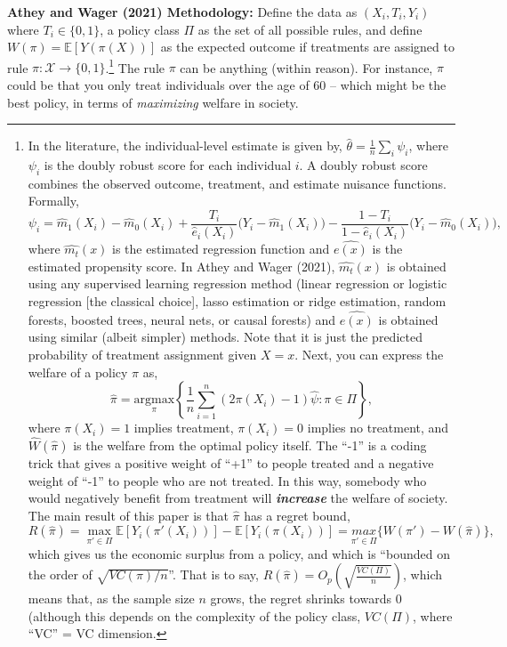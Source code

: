 \documentclass[12pt,letterpaper,doublespace, oneside]{article}
\begin{document}
\noindent\textbf{Athey and Wager (2021) Methodology:} 
Define the data as $(X_i,T_i,Y_i)$ where $T_i \in \{0,1\}$, a policy class $\Pi$ as the set of all possible rules, and define $W(\pi) = \mathbb{E}[Y(\pi(X))]$ as the expected outcome if treatments are assigned to rule $\pi: \mathcal{X} \to \{0,1\}$.\footnote{In the literature, the individual-level estimate is given by, $\hat{\theta} = \frac{1}{n}\sum_i\psi_i$, where $\psi_i$ is the doubly robust score for each individual $i$. A doubly robust score combines the observed outcome, treatment, and estimate nuisance functions. Formally, 
\[
\psi_i = \hat{m}_1(X_i) - \hat{m}_0(X_i) + \frac{T_i}{\hat{e}_i(X_i)}\big(Y_i - \hat{m}_1(X_i)\big) - \frac{1-T_i}{1 - \hat{e}_i(X_i)}\big(Y_i - \hat{m}_0(X_i)\big),
\]
where $\hat{m_t}(x)$ is the estimated regression function and $\hat{e(x)}$ is the estimated propensity score. In Athey and Wager (2021), $\hat{m_t}(x)$ is obtained using any supervised learning regression method (linear regression or logistic regression [the classical choice], lasso estimation or ridge estimation, random forests, boosted trees, neural nets, or causal forests) and $\hat{e(x)}$ is obtained using similar (albeit simpler) methods. Note that it is just the predicted probability of treatment assignment given $X = x$. Next, you can express the welfare of a policy $\pi$ as,
\[
\hat{\pi} = \underset{\pi}{\text{argmax}}\left\{\frac{1}{n}\sum_{i=1}^n(2\pi(X_i) - 1)\hat{\psi}: \pi \in \Pi\right\},
\]
where $\pi(X_i) = 1$ implies treatment, $\pi(X_i) = 0$ implies no treatment, and $\hat{W}(\hat{\pi})$ is the welfare from the optimal policy itself. The \enquote{-1} is a coding trick that gives a positive weight of \enquote{+1} to people treated and a negative weight of \enquote{-1} to people who are not treated. In this way, somebody who would negatively benefit from treatment will \emph{\textbf{increase}} the welfare of society. The main result of this paper is that $\hat{\pi}$ has a regret bound,
\[
R(\hat{\pi}) = \max_{\pi' \in \Pi}\mathbb{E}[Y_i(\pi'(X_i))] - \mathbb{E}[Y_i(\pi(X_i))] = \underset{\pi'\in\Pi}{max}\{W(\pi')-W(\hat{\pi})\},
\]
which gives us the economic surplus from a policy, and which is \enquote{bounded on the order of $\sqrt{VC(\pi)/n}$}. That is to say, $R(\hat{\pi}) = O_p(\sqrt{\frac{VC(\Pi)}{n}})$, which means that, as the sample size $n$ grows, the regret shrinks towards $0$ (although this depends on the complexity of the policy class, $VC(\Pi)$, where \enquote{VC} = VC dimension.} The rule $\pi$ can be anything (within reason). For instance, $\pi$ could be that you only treat individuals over the age of 60 -- which might be the best policy, in terms of \emph{maximizing} welfare in society.
\end{document}
